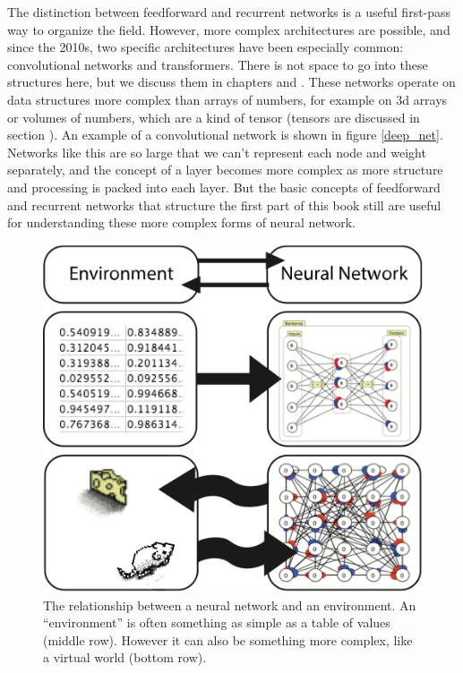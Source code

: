 The distinction between feedforward and recurrent networks is a useful first-pass way to organize the field. However, more complex architectures are possible, and since the 2010s, two specific architectures have been especially common: convolutional networks and transformers.  There is not space to go into these structures here, but we discuss them in chapters  and . These networks operate on data structures more complex than arrays of numbers, for example on 3d arrays or volumes of numbers, which are a kind of tensor (tensors are discussed in section ). An example of a convolutional network is shown in figure \ref{deep_net}. Networks like this are so large that we can't represent each node and weight separately, and the concept of a layer becomes more complex as more structure and processing is packed into each layer. But the basic concepts of feedforward and recurrent networks that structure the first part of this book still are useful for understanding these more complex forms of neural network. 

\begin{figure}[h]
\centering
\includegraphics[scale=.7]{./images/nn_environment.png}
\caption[Pamela Payne.]{The relationship between a neural network and an environment. An ``environment'' is often something as simple as a table of values (middle row). However it can also be something more complex, like a virtual world (bottom row).}
\label{nn_environment}
\end{figure}

